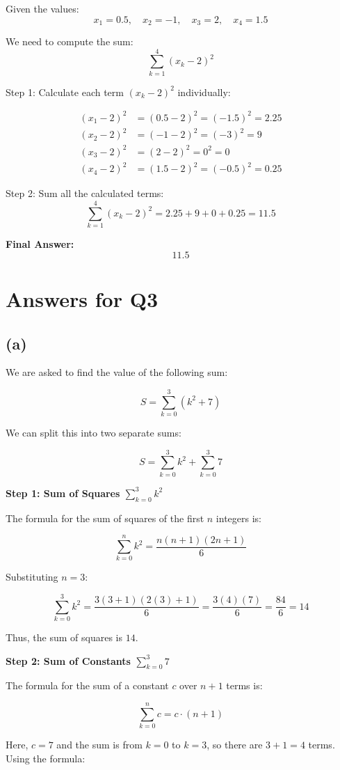\documentclass{article}
\begin{document}
Given the values:
\[
x_1 = 0.5, \quad x_2 = -1, \quad x_3 = 2, \quad x_4 = 1.5
\]

We need to compute the sum:
\[
\sum_{k=1}^4 (x_k - 2)^2
\]

\noindent Step 1: Calculate each term \((x_k - 2)^2\) individually:

\begin{align*}
(x_1 - 2)^2 &= (0.5 - 2)^2 = (-1.5)^2 = 2.25 \\
(x_2 - 2)^2 &= (-1 - 2)^2 = (-3)^2 = 9 \\
(x_3 - 2)^2 &= (2 - 2)^2 = 0^2 = 0 \\
(x_4 - 2)^2 &= (1.5 - 2)^2 = (-0.5)^2 = 0.25
\end{align*}

\noindent Step 2: Sum all the calculated terms:
\[
\sum_{k=1}^4 (x_k - 2)^2 = 2.25 + 9 + 0 + 0.25 = 11.5
\]

\noindent \textbf{Final Answer:}
\[
\boxed{11.5}
\]
\section{Answers for Q3}
\subsection*{(a)}
We are asked to find the value of the following sum:

\[
S = \sum_{k=0}^3 (k^2 + 7)
\]

We can split this into two separate sums:

\[
S = \sum_{k=0}^3 k^2 + \sum_{k=0}^3 7
\]

\textbf{Step 1: Sum of Squares \( \sum_{k=0}^3 k^2 \)}

The formula for the sum of squares of the first \( n \) integers is:

\[
\sum_{k=0}^n k^2 = \frac{n(n+1)(2n+1)}{6}
\]

Substituting \( n = 3 \):

\[
\sum_{k=0}^3 k^2 = \frac{3(3+1)(2(3)+1)}{6} = \frac{3(4)(7)}{6} = \frac{84}{6} = 14
\]

Thus, the sum of squares is \( 14 \).

\textbf{Step 2: Sum of Constants \( \sum_{k=0}^3 7 \)}

The formula for the sum of a constant \( c \) over \( n+1 \) terms is:

\[
\sum_{k=0}^n c = c \cdot (n + 1)
\]

Here, \( c = 7 \) and the sum is from \( k = 0 \) to \( k = 3 \), so there are \( 3 + 1 = 4 \) terms. Using the formula:
\end{document}
